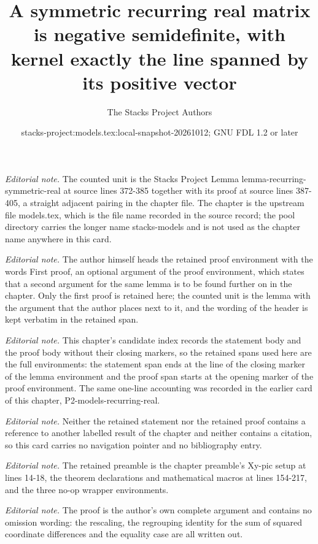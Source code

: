 \documentclass[10pt,a4paper]{amsart}
\title{A symmetric recurring real matrix is negative semidefinite, with kernel exactly the line spanned by its positive vector}
\author{The Stacks Project Authors}
\date{stacks-project:models.tex:local-snapshot-20261012; GNU FDL 1.2 or later}
\theoremstyle{plain}
\theoremstyle{definition}
\theoremstyle{remark}
\numberwithin{equation}{subsection}
\begin{document}
\maketitle
\noindent\textit{Editorial note.} The counted unit is the Stacks Project Lemma lemma-recurring-symmetric-real at source lines 372-385 together with its proof at source lines 387-405, a straight adjacent pairing in the chapter file. The chapter is the upstream file models.tex, which is the file name recorded in the source record; the pool directory carries the longer name stacks-models and is not used as the chapter name anywhere in this card.\par\medskip
\noindent\textit{Editorial note.} The author himself heads the retained proof environment with the words First proof, an optional argument of the proof environment, which states that a second argument for the same lemma is to be found further on in the chapter. Only the first proof is retained here; the counted unit is the lemma with the argument that the author places next to it, and the wording of the header is kept verbatim in the retained span.\par\medskip
\noindent\textit{Editorial note.} This chapter's candidate index records the statement body and the proof body without their closing markers, so the retained spans used here are the full environments: the statement span ends at the line of the closing marker of the lemma environment and the proof span starts at the opening marker of the proof environment. The same one-line accounting was recorded in the earlier card of this chapter, P2-models-recurring-real.\par\medskip
\noindent\textit{Editorial note.} Neither the retained statement nor the retained proof contains a reference to another labelled result of the chapter and neither contains a citation, so this card carries no navigation pointer and no bibliography entry.\par\medskip
\noindent\textit{Editorial note.} The retained preamble is the chapter preamble's Xy-pic setup at lines 14-18, the theorem declarations and mathematical macros at lines 154-217, and the three no-op wrapper environments.\par\medskip
\noindent\textit{Editorial note.} The proof is the author's own complete argument and contains no omission wording: the rescaling, the regrouping identity for the sum of squared coordinate differences and the equality case are all written out.\par\medskip
\end{document}
